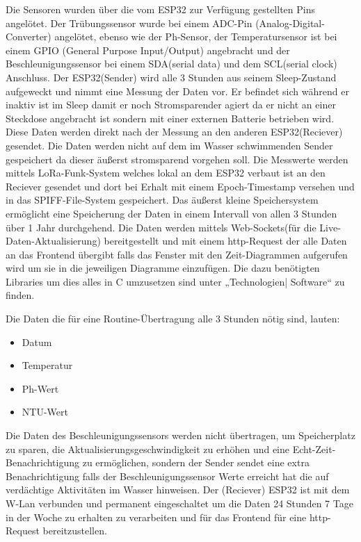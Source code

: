 Die Sensoren wurden über die vom ESP32 zur Verfügung gestellten Pins angelötet. 
Der Trübungssensor wurde bei einem ADC-Pin (Analog-Digital-Converter) angelötet, 
ebenso wie der Ph-Sensor, der Temperatursensor ist bei einem GPIO (General Purpose Input/Output) angebracht und der Beschleunigungssensor bei einem SDA(serial data) und dem SCL(serial clock) Anschluss. 
Der ESP32(Sender) wird alle 3 Stunden aus seinem Sleep-Zustand aufgeweckt und nimmt eine Messung der Daten vor. Er befindet sich während er inaktiv ist im Sleep damit er noch Stromsparender agiert da er nicht an einer Steckdose angebracht ist sondern mit einer externen Batterie betrieben wird.
Diese Daten werden direkt nach der Messung an den anderen ESP32(Reciever) gesendet. 
Die Daten werden nicht auf dem im Wasser schwimmenden Sender gespeichert da dieser äußerst stromsparend vorgehen soll. 
Die Messwerte werden mittels LoRa-Funk-System welches lokal an dem ESP32 verbaut ist an den Reciever gesendet und dort bei Erhalt mit einem Epoch-Timestamp versehen und in das SPIFF-File-System gespeichert. 
Das äußerst kleine Speichersystem ermöglicht eine Speicherung der Daten in einem Intervall von allen 3 Stunden über 1 Jahr durchgehend. 
Die Daten werden mittels Web-Sockets(für die Live-Daten-Aktualisierung) bereitgestellt und mit einem http-Request der alle Daten an das Frontend übergibt falls das Fenster mit den Zeit-Diagrammen aufgerufen wird um sie in die jeweiligen Diagramme einzufügen. 
Die dazu benötigten Libraries um dies alles in C umzusetzen sind unter „Technologien| Software“ zu finden. 

\newpage
Die Daten die für eine Routine-Übertragung alle 3 Stunden nötig sind, lauten:

\begin{itemize}
  \item Datum
  \item Temperatur
  \item Ph-Wert
  \item NTU-Wert
\end{itemize}

Die Daten des Beschleunigungssensors werden nicht übertragen, um Speicherplatz zu sparen, die Aktualisierungsgeschwindigkeit 
zu erhöhen und eine Echt-Zeit-Benachrichtigung zu ermöglichen, sondern der Sender sendet eine extra Benachrichtigung falls 
der Beschleunigungssensor Werte erreicht hat die auf verdächtige Aktivitäten im Wasser hinweisen. 
Der (Reciever) ESP32 ist  mit dem W-Lan verbunden und permanent eingeschaltet um die Daten 24 Stunden 7 Tage 
in der Woche zu erhalten zu verarbeiten und für das Frontend für eine http-Request bereitzustellen. 

